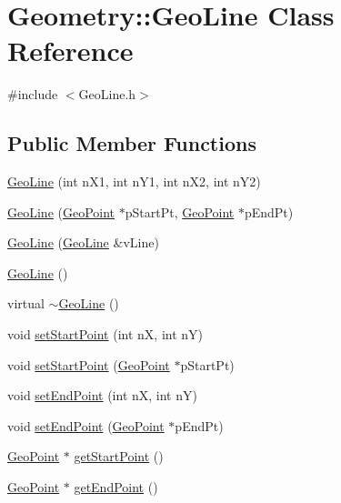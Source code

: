 \hypertarget{class_geometry_1_1_geo_line}{\section{Geometry\+:\+:Geo\+Line Class Reference}
\label{class_geometry_1_1_geo_line}
}


{\ttfamily \#include $<$Geo\+Line.\+h$>$}

\subsection*{Public Member Functions}
\begin{DoxyCompactItemize}
\item 
\hyperlink{class_geometry_1_1_geo_line_a0203f097bd18ba73bcaeff41ff468420}{Geo\+Line} (int n\+X1, int n\+Y1, int n\+X2, int n\+Y2)
\item 
\hyperlink{class_geometry_1_1_geo_line_a2fa9b88fe9d44324f15e8b8d15f769a9}{Geo\+Line} (\hyperlink{class_geometry_1_1_geo_point}{Geo\+Point} $\ast$p\+Start\+Pt, \hyperlink{class_geometry_1_1_geo_point}{Geo\+Point} $\ast$p\+End\+Pt)
\item 
\hyperlink{class_geometry_1_1_geo_line_ad34fe7bd15a905a08a9593b67abdc25c}{Geo\+Line} (\hyperlink{class_geometry_1_1_geo_line}{Geo\+Line} \&v\+Line)
\item 
\hyperlink{class_geometry_1_1_geo_line_a4ea983b5dfd6a3d2ecf1d07279e0fc3d}{Geo\+Line} ()
\item 
virtual \hyperlink{class_geometry_1_1_geo_line_a382877221f6aa61eb8161ef9499e4490}{$\sim$\+Geo\+Line} ()
\item 
void \hyperlink{class_geometry_1_1_geo_line_a5087cd127a61944da6611a6495eb2c9c}{set\+Start\+Point} (int n\+X, int n\+Y)
\item 
void \hyperlink{class_geometry_1_1_geo_line_a0eec9e822243f07aa833d7750649877c}{set\+Start\+Point} (\hyperlink{class_geometry_1_1_geo_point}{Geo\+Point} $\ast$p\+Start\+Pt)
\item 
void \hyperlink{class_geometry_1_1_geo_line_ab6b720dcb1b1bda68c9a480c7e90e972}{set\+End\+Point} (int n\+X, int n\+Y)
\item 
void \hyperlink{class_geometry_1_1_geo_line_aa20821de88980b6d3c83db2e7e992682}{set\+End\+Point} (\hyperlink{class_geometry_1_1_geo_point}{Geo\+Point} $\ast$p\+End\+Pt)
\item 
\hyperlink{class_geometry_1_1_geo_point}{Geo\+Point} $\ast$ \hyperlink{class_geometry_1_1_geo_line_a1bafce47da51c1d3b977d35c0bbed2e9}{get\+Start\+Point} ()
\item 
\hyperlink{class_geometry_1_1_geo_point}{Geo\+Point} $\ast$ \hyperlink{class_geometry_1_1_geo_line_af94813b9f5ef1b280317adc954f23f43}{get\+End\+Point} ()
\end{DoxyCompactItemize}


